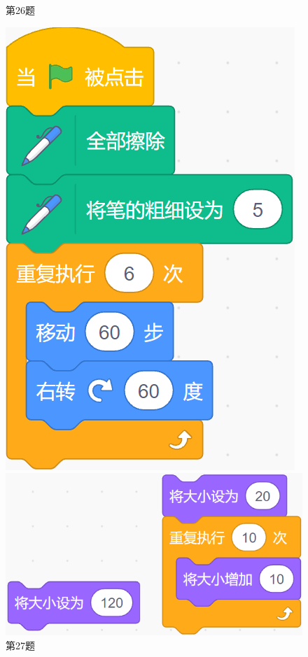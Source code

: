 \documentclass[10pt, a4paper]{article}
\begin{document}
\begin{enumerate}
\begin{figure}[htbp]
\begin{minipage}[t]{.36\textwidth}
\begin{minipage}[t]{.5\textwidth}
                \end{minipage}
                \caption*{第26题}
            \end{minipage}
            \begin{minipage}[t]{.12\textwidth}
                \centering
                \includegraphics[width=\textwidth]{27.png}
                \caption*{第27题}
            \end{minipage}
            \begin{minipage}[t]{.2\textwidth}
                \centering
                \includegraphics[width=\textwidth]{28.png}

\end{minipage}
\end{figure}
\end{enumerate}
\end{document}
